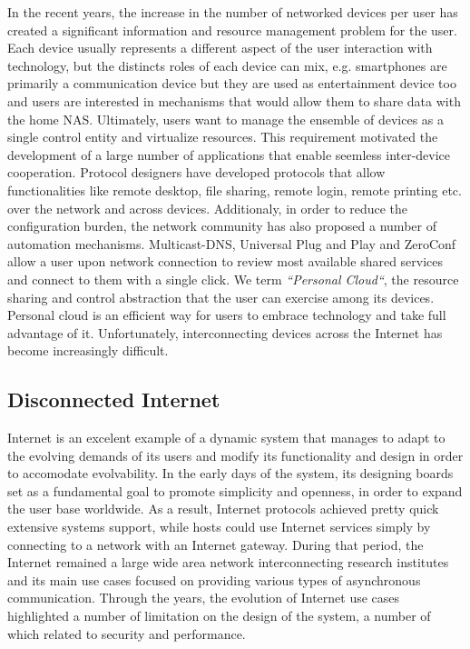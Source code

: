 In the recent years, the increase in the number of networked devices per user
has created a significant information and resource management problem for the
user.  Each device usually represents a different aspect of the user interaction
with technology, but the distincts roles of each device can mix, e.g.
smartphones are primarily a communication device but they are used as
entertainment device too and users are interested in mechanisms that would allow
them to share data with the home NAS.  Ultimately, users want
to manage the ensemble of devices as a single control entity and virtualize
resources. This requirement motivated the development of a large number of
applications that enable seemless inter-device cooperation. Protocol designers
have developed protocols that allow functionalities like remote desktop, file
sharing, remote login, remote printing etc. over the network and across devices.
Additionaly, in order to reduce the configuration burden, the network community
has also proposed a number of automation mechanisms.  Multicast-DNS, Universal
Plug and Play and ZeroConf allow a user upon network connection to review most
available shared services and connect to them with a single click. We term {\it
  ``Personal Cloud``}, the resource sharing and control abstraction that the user 
can exercise among its devices. Personal cloud is an efficient way for users
to
embrace technology and take full advantage of it. Unfortunately, interconnecting 
devices across the Internet has become increasingly difficult.

\subsection{Disconnected Internet}

Internet is an excelent example of a dynamic system that manages to adapt to the
evolving demands of its users and modify its functionality and design in order
to accomodate evolvability.  In the early days of the system, its designing
boards set as a fundamental goal to promote simplicity and openness, in order to
expand the user base worldwide. As a result, Internet protocols achieved pretty
quick extensive systems support, while hosts could use Internet services simply
by connecting to a network with an Internet gateway. During that period, the
Internet remained a large wide area network interconnecting research institutes
and its main use cases focused on providing various types of asynchronous
communication. Through the years, the evolution of Internet use cases
highlighted a number of limitation on the design of the system, a number of
which related to security and performance.

